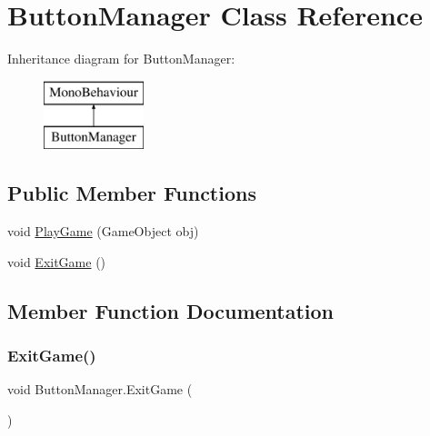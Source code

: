 \hypertarget{class_button_manager}{}\section{Button\+Manager Class Reference}
\label{class_button_manager}
Inheritance diagram for Button\+Manager\+:\begin{figure}[H]
\begin{center}
\leavevmode
\includegraphics[height=2.000000cm]{class_button_manager}
\end{center}
\end{figure}
\subsection*{Public Member Functions}
\begin{DoxyCompactItemize}
\item 
void \mbox{\hyperlink{class_button_manager_a9728abfb3af4eb95eb03596fe831151b}{Play\+Game}} (Game\+Object obj)
\item 
void \mbox{\hyperlink{class_button_manager_a8984c32d0eb666371e65529605f3babf}{Exit\+Game}} ()
\end{DoxyCompactItemize}


\subsection{Member Function Documentation}
\mbox{\label{class_button_manager_a8984c32d0eb666371e65529605f3babf}} 
\subsubsection{\texorpdfstring{Exit\+Game()}{ExitGame()}}
{\footnotesize\ttfamily void Button\+Manager.\+Exit\+Game (\begin{DoxyParamCaption}{ }\end{DoxyParamCaption})\hspace{0.3cm}{\ttfamily [inline]}}

\mbox{\label{class_button_manager_a9728abfb3af4eb95eb03596fe831151b}} 

